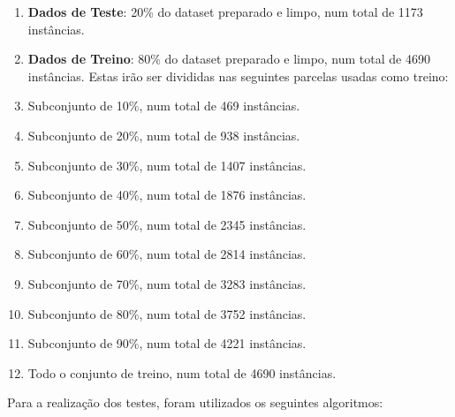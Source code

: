 \documentclass{easychair}
\begin{document}
\begin{enumerate}
	\item \textbf{Dados de Teste}: 20\% do dataset preparado e limpo, num total de 1173 instâncias.
	\item \textbf{Dados de Treino}: 80\% do dataset preparado e limpo, num total de 4690 instâncias. Estas irão ser divididas nas seguintes parcelas usadas como treino:
		\item[\textbullet] Subconjunto de 10\%, num total de 469 instâncias.
		\item[\textbullet] Subconjunto de 20\%, num total de 938 instâncias.
		\item[\textbullet] Subconjunto de 30\%, num total de 1407 instâncias.
		\item[\textbullet] Subconjunto de 40\%, num total de 1876 instâncias.
		\item[\textbullet] Subconjunto de 50\%, num total de 2345 instâncias.
		\item[\textbullet] Subconjunto de 60\%, num total de 2814 instâncias.
		\item[\textbullet] Subconjunto de 70\%, num total de 3283 instâncias.
		\item[\textbullet] Subconjunto de 80\%, num total de 3752 instâncias.
		\item[\textbullet] Subconjunto de 90\%, num total de 4221 instâncias.
		\item[\textbullet] Todo o conjunto de treino, num total de 4690 instâncias.
\end{enumerate}

\newpage
Para a realização dos testes, foram utilizados os seguintes algoritmos:
\end{document}
